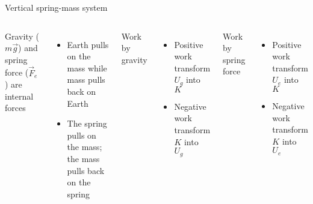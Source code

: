 \documentclass[12pt,compress,aspectratio=169]{beamer}
\begin{document}
\begin{frame}[t]{Vertical spring-mass system}
  \begin{columns}[T]
    \centering

    Gravity ($m\vec g$) and spring force ($\vec F_e$) are internal forces
    \begin{itemize}
    \item Earth pulls on the mass while mass pulls back on Earth
    \item The spring pulls on the mass; the mass pulls back on the spring
    \end{itemize}
    Work by gravity
    \begin{itemize}
    \item Positive work transform $U_g$ into $K$
    \item Negative work transform $K$ into $U_g$
    \end{itemize}
    Work by spring force
    \begin{itemize}
    \item Positive work transform $U_e$ into $K$
    \item Negative work transform $K$ into $U_e$
    \end{itemize}
  \end{columns}
\end{frame}
\end{document}
